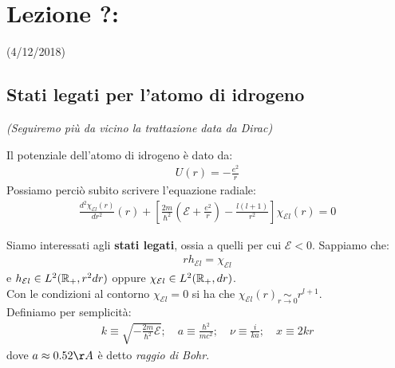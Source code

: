 \documentclass[../../FisicaTeorica.tex]{subfiles}
\begin{document}
\section{Lezione ?:\\ \large{}}
\vspace{-1em}
\begin{center}
    \small{(4/12/2018)}
\end{center}

\subsection{Stati legati per l'atomo di idrogeno}
\textit{(Seguiremo più da vicino la trattazione data da Dirac)}

Il potenziale dell'atomo di idrogeno è dato da:
\begin{align*}
U(r) = -\frac{e^2}{r}
\end{align*}
Possiamo perciò subito scrivere l'equazione radiale:
\begin{align}
\frac{d^2\chi_{\mathcal{E}l}(r)}{dr^2}(r) +\left[\frac{2m}{\hbar^2}\left(\mathcal{E}+\frac{e^2}{r}\right)-\frac{l(l+1)}{r^2}\right]\chi_{\mathcal{E}l}(r) = 0
\label{eqn:autovalori_idrogeno_rad}
\end{align}

Siamo interessati agli \textbf{stati legati}, ossia a quelli per cui $\mathcal{E}<0$. Sappiamo che:
\begin{align*}
rh_{\mathcal{E}l} = \chi_{\mathcal{E}l}
\end{align*}
e $h_{\mathcal{E}l} \in L^2(\mathbb{R}_+, r^2 dr)$ oppure $\chi_{\mathcal{E}l} \in L^2(\mathbb{R}_+, dr)$.\\
Con le condizioni al contorno $\chi_{\mathcal{E}l} = 0$ si ha che $\chi_{\mathcal{E}l} (r) \underset{r \to 0}{\sim} r^{l+1}$.\\
Definiamo per semplicità:
\begin{align*}
k \equiv \sqrt{-\frac{2m}{\hbar^2}\mathcal{E}}; \quad a \equiv \frac{\hbar^2}{mc^2}; \quad \nu \equiv \frac{i}{ka}; \quad x \equiv 2kr
\end{align*}
dove $a \approx 0.52 \AA$ è detto \textit{raggio di Bohr}.\\
\end{document}

